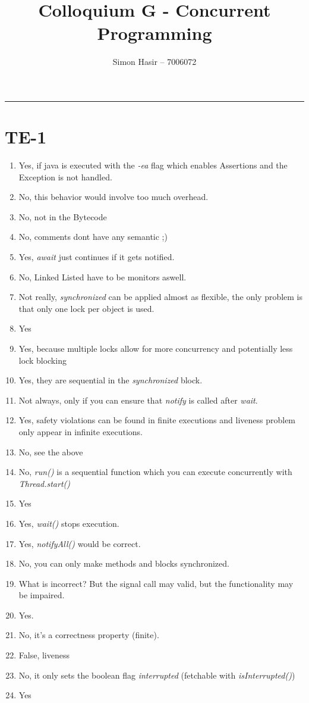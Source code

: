 \documentclass[12pt]{article}
\title{Colloquium G - Concurrent Programming}
\author{Simon Hasir -- 7006072}
\begin{document}
    \maketitle
    \noindent
    \rule{\linewidth}{0.4pt}
             
    \section{TE-1}
    \begin{enumerate}[label=(\alph*)]
        \item Yes, if java is executed with the \textit{-ea} flag which enables Assertions and the Exception is not handled.
        \item No, this behavior would involve too much overhead.
        \item No, not in the Bytecode
        \item No, comments dont have any semantic ;)
        \item Yes, \textit{await} just continues if it gets notified.
        \item No, Linked Listed have to be monitors aswell.
        \item Not really, \textit{synchronized} can be applied almost as flexible, the only problem is that only one lock per object is used.
        \item Yes 
        \item Yes, because multiple locks allow for more concurrency and potentially less lock blocking 
        \item Yes, they are sequential in the \textit{synchronized} block.
        \item Not always, only if you can ensure that \textit{notify} is called after \textit{wait}. 
        \item Yes, safety violations can be found in finite executions and liveness problem only appear in infinite executions.
        \item No, see the above
        \item No, \textit{run()} is a sequential function which you can execute concurrently with \textit{Thread.start()}
        \item Yes
        \item Yes, \textit{wait()} stops execution.
        \item Yes, \textit{notifyAll()} would be correct.
        \item No, you can only make methods and blocks synchronized.
        \item What is incorrect? But the signal call may valid, but the functionality may be impaired.
        \item Yes.
        \item No, it's a correctness property (finite).
        \item False, liveness 
        \item No, it only sets the boolean flag \textit{interrupted} (fetchable with \textit{isInterrupted()})
        \item Yes
    \end{enumerate}
\end{document}

